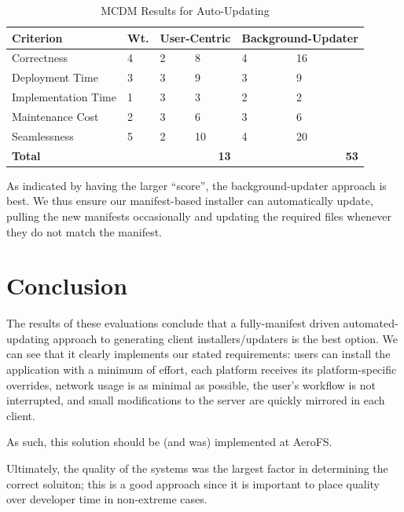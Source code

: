 \documentclass[12pt]{article}
\begin{document}
\begin{table}[ht]
\caption{MCDM Results for Auto-Updating}
\label{tbl:mcdm-autoup}
\centering
\begin{tabular}{|p{5.0cm}|p{0.65cm}|p{0.5cm}|p{0.5cm}|p{1.7cm}|p{1.7cm}|}
    \hline
    {\bf Criterion} & {\bf Wt.} & \multicolumn{2}{|p{1cm}|}{{\bf User-Centric}} & \multicolumn{2}{|p{3.4cm}|}{{\bf \mbox{Background-Updater}}} \\
    \hline
    \hline
    Correctness         &  4 & 2 &  8 & 4 & 16 \\
    Deployment Time     &  3 & 3 &  9 & 3 &  9 \\
    Implementation Time &  1 & 3 &  3 & 2 &  2 \\
    Maintenance Cost    &  2 & 3 &  6 & 3 &  6 \\
    Seamlessness        &  5 & 2 & 10 & 4 & 20 \\
    \hline
    \hline
    {\bf Total}         &    & \multicolumn{2}{|r|}{{\bf 13}} & \multicolumn{2}{|r|}{{\bf 53}} \\
    \hline
\end{tabular}
\end{table}

As indicated by having the larger ``score'', the background-updater approach is best. We thus ensure our manifest-based installer can automatically update, pulling the new manifests occasionally and updating the required files whenever they do not match the manifest.
\newpage


\section{Conclusion}
The results of these evaluations conclude that a fully-manifest driven automated-updating approach to generating client installers/updaters is the best option. We can see that it clearly implements our stated requirements: users can install the application with a minimum of effort, each platform receives its platform-specific overrides, network usage is as minimal as possible, the user's workflow is not interrupted, and small modifications to the server are quickly mirrored in each client.

As such, this solution should be (and was) implemented at AeroFS.

Ultimately, the quality of the systems was the largest factor in determining the correct soluiton; this is a good approach since it is important to place quality over developer time in non-extreme cases.
\newpage
\end{document}
